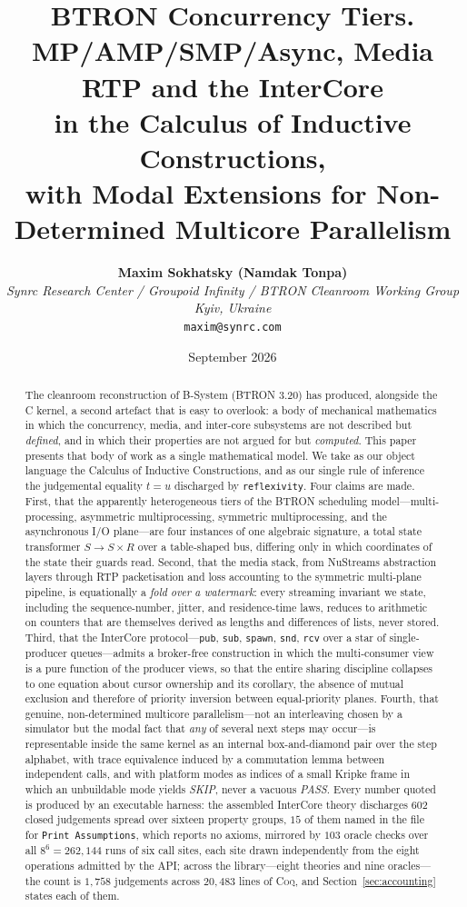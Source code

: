 \documentclass[10pt,journal,compsoc,twocolumn]{article}
\title{\LARGE \textbf{BTRON Concurrency Tiers.\\ MP/AMP/SMP/Async, Media RTP and the InterCore\\ in the Calculus of Inductive Constructions,\\ with Modal Extensions for Non-Determined Multicore Parallelism}}
\author{
    \textbf{Maxim Sokhatsky (Namdak Tonpa)}\\[0.3em]
    \small \textit{Synrc Research Center / Groupoid Infinity / BTRON Cleanroom Working Group}\\
    \small \textit{Kyiv, Ukraine}\\
    \small \texttt{maxim@synrc.com}
}
\date{September 2026}
\theoremstyle{definition}
\theoremstyle{remark}
\theoremstyle{plain}
\newcommand{\Coq}{\textsc{Coq}}
\newcommand{\ctr}[1]{\texttt{#1}}
\begin{document}
\maketitle

\begin{abstract}
The cleanroom reconstruction of B-System (BTRON 3.20) has produced, alongside the C kernel, a second artefact that is easy to overlook: a body of mechanical mathematics in which the concurrency, media, and inter-core subsystems are not described but \emph{defined}, and in which their properties are not argued for but \emph{computed}. This paper presents that body of work as a single mathematical model. We take as our object language the Calculus of Inductive Constructions, and as our single rule of inference the judgemental equality $t = u$ discharged by \ctr{reflexivity}. Four claims are made. First, that the apparently heterogeneous tiers of the BTRON scheduling model---multi-processing, asymmetric multiprocessing, symmetric multiprocessing, and the asynchronous I/O plane---are four instances of one algebraic signature, a total state transformer $S \to S \times R$ over a table-shaped bus, differing only in which coordinates of the state their guards read. Second, that the media stack, from NuStreams abstraction layers through RTP packetisation and loss accounting to the symmetric multi-plane pipeline, is equationally a \emph{fold over a watermark}: every streaming invariant we state, including the sequence-number, jitter, and residence-time laws, reduces to arithmetic on counters that are themselves derived as lengths and differences of lists, never stored. Third, that the InterCore protocol---\ctr{pub}, \ctr{sub}, \ctr{spawn}, \ctr{snd}, \ctr{rcv} over a star of single-producer queues---admits a broker-free construction in which the multi-consumer view is a pure function of the producer views, so that the entire sharing discipline collapses to one equation about cursor ownership and its corollary, the absence of mutual exclusion and therefore of priority inversion between equal-priority planes. Fourth, that genuine, non-determined multicore parallelism---not an interleaving chosen by a simulator but the modal fact that \emph{any} of several next steps may occur---is representable inside the same kernel as an internal box-and-diamond pair over the step alphabet, with trace equivalence induced by a commutation lemma between independent calls, and with platform modes as indices of a small Kripke frame in which an unbuildable mode yields \emph{SKIP}, never a vacuous \emph{PASS}. Every number quoted is produced by an executable harness: the assembled InterCore theory discharges \(602\) closed judgements spread over sixteen property groups, \(15\) of them named in the file for \ctr{Print Assumptions}, which reports no axioms, mirrored by \(103\) oracle checks over all $8^{6} = 262{,}144$ runs of six call sites, each site drawn independently from the eight operations admitted by the API; across the library---eight theories and nine oracles---the count is $1{,}758$ judgements across $20{,}483$ lines of \Coq{}, and Section~\ref{sec:accounting} states each of them.
\end{abstract}
\end{document}
